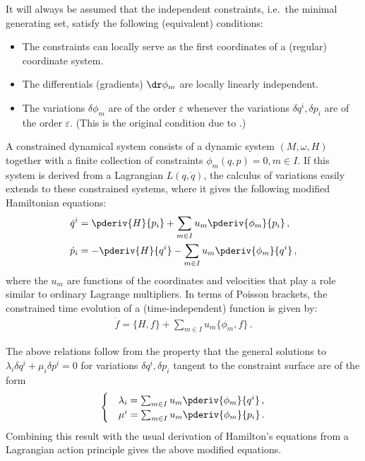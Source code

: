     \begin{axiom}\label{constraint:regularity}
        It will always be assumed that the independent constraints, i.e.~the minimal generating set, satisfy the following (equivalent) conditions:
        \begin{itemize}
            \item The constraints can locally serve as the first coordinates of a (regular) coordinate system.
            \item The differentials (gradients) $\dr\phi_m$ are locally linearly independent.
            \item The variations $\delta\phi_m$ are of the order $\varepsilon$ whenever the variations $\delta q^i,\delta p_i$ are of the order $\varepsilon$. (This is the original condition due to .)
        \end{itemize}
    \end{axiom}

    A constrained dynamical system consists of a dynamic system $(M,\omega,H)$ together with a finite collection of constraints $\phi_m(q,p)=0,m\in I$. If this system is derived from a Lagrangian $L(q,\dot{q})$, the calculus of variations easily extends to these constrained systems, where it gives the following modified Hamiltonian equations:
    \begin{align}
        \dot{q}^i &= \pderiv{H}{p_i} + \sum_{m\in I}u_m\pderiv{\phi_m}{p_i}\,,\\
        \dot{p}_i &= -\pderiv{H}{q^i} - \sum_{m\in I}u_m\pderiv{\phi_m}{q^i}\,,
    \end{align}
    where the $u_m$ are functions of the coordinates and velocities that play a role similar to ordinary Lagrange multipliers. In terms of Poisson brackets, the constrained time evolution of a (time-independent) function is given by:
    \begin{gather}
        \label{constraint:modified_poisson_evolution}
        \dot{f} = \{H,f\} + \sum_{m\in I}u_m\{\phi_m,f\}\,.
    \end{gather}

    \begin{remark}
        The above relations follow from the property that the general solutions to $\lambda_i\delta q^i + \mu_i\delta p^i = 0$ for variations $\delta q^i,\delta p_i$ tangent to the constraint surface are of the form
        \begin{gather}
            \begin{cases}
                &\lambda_i = \sum_{m\in I}u_m\pderiv{\phi_m}{q^i}\,,\\
                &\mu^i = \sum_{m\in I}u_m\pderiv{\phi_m}{p_i}\,.
            \end{cases}
        \end{gather}
        Combining this result with the usual derivation of Hamilton's equations from a Lagrangian action principle gives the above modified equations.
    \end{remark}

